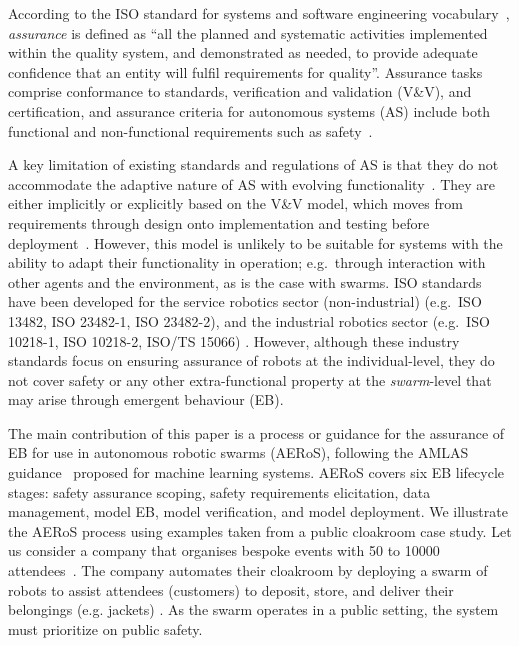 \documentclass[runningheads]{llncs}
\begin{document}
According to the ISO standard for systems and software engineering vocabulary~\cite{ISO24765:2017}, \emph{assurance} is defined as ``all the planned and systematic activities implemented within the quality system, and demonstrated as needed, to provide adequate confidence that an entity will fulfil requirements for quality''. 
Assurance tasks comprise conformance to standards, verification and validation (V\&V), and certification, and assurance criteria for autonomous systems (AS) include both functional and non-functional requirements such as safety~\cite{Cheng2014}. 

A key limitation of existing standards and regulations of AS is that they do not accommodate the adaptive nature of AS with evolving functionality~\cite{Fisher2020}. 
They are either implicitly or explicitly based on the V\&V model, which moves from requirements through design onto implementation and testing before deployment~\cite{Jia2021}. 
However, this model is unlikely to be suitable for systems with the ability to adapt their functionality in operation; e.g.\ through interaction with other agents and the environment, as is the case with swarms. 
ISO standards have been developed for the service robotics sector (non-industrial) (e.g.\ ISO 13482, ISO 23482-1, ISO 23482-2), and the industrial robotics sector (e.g.\ ISO 10218-1, ISO 10218-2, ISO/TS 15066) \cite{Abeywickrama2022}. 
However, although these industry standards focus on ensuring assurance of robots at the individual-level, they do not cover safety or any other extra-functional property at the \emph{swarm}-level that may arise through emergent behaviour (EB). %

The main contribution of this paper is a process or guidance for the assurance of EB for use in autonomous robotic swarms (AERoS), following the AMLAS guidance~\cite{Hawkins2021} proposed for machine learning systems. 
AERoS covers six EB lifecycle stages: safety assurance scoping, safety requirements elicitation, data management, model EB, model verification, and model deployment. 
We illustrate the AERoS process using examples taken from a public cloakroom case study. 
Let us consider a company that organises bespoke events with 50 to 10000 attendees~\cite{Jones2020}. 
The company automates their cloakroom by deploying a swarm of robots to assist attendees (customers) to deposit, store, and deliver their belongings (e.g. jackets) \cite{Jones2020}. 
As the swarm operates in a public setting, the system must prioritize on public safety. 
\end{document}
